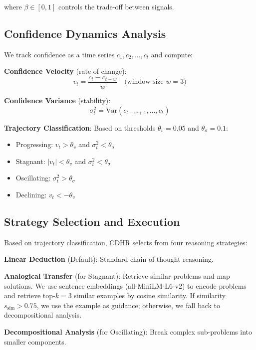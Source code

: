 \documentclass{article}
\begin{document}
where $\beta \in [0, 1]$ controls the trade-off between signals.

\subsection{Confidence Dynamics Analysis}

We track confidence as a time series $c_1, c_2, \ldots, c_t$ and compute:

\textbf{Confidence Velocity} (rate of change):
\begin{equation}
v_t = \frac{c_t - c_{t-w}}{w} \quad \text{(window size $w=3$)}
\end{equation}

\textbf{Confidence Variance} (stability):
\begin{equation}
\sigma_t^2 = \text{Var}(c_{t-w+1}, \ldots, c_t)
\end{equation}

\textbf{Trajectory Classification}: Based on thresholds $\theta_v = 0.05$ and $\theta_\sigma = 0.1$:
\begin{itemize}
    \item Progressing: $v_t > \theta_v$ and $\sigma_t^2 < \theta_\sigma$
    \item Stagnant: $|v_t| < \theta_v$ and $\sigma_t^2 < \theta_\sigma$
    \item Oscillating: $\sigma_t^2 > \theta_\sigma$
    \item Declining: $v_t < -\theta_v$
\end{itemize}

\subsection{Strategy Selection and Execution}

Based on trajectory classification, CDHR selects from four reasoning strategies:

\textbf{Linear Deduction} (Default): Standard chain-of-thought reasoning.

\textbf{Analogical Transfer} (for Stagnant): Retrieve similar problems and map solutions. We use sentence embeddings (all-MiniLM-L6-v2) to encode problems and retrieve top-$k=3$ similar examples by cosine similarity. If similarity $s_{\text{sim}} > 0.75$, we use the example as guidance; otherwise, we fall back to decompositional analysis.

\textbf{Decompositional Analysis} (for Oscillating): Break complex sub-problems into smaller components.
\end{document}
